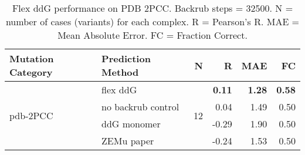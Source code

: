 \begin{table}
  \begin{tabular}{llrrrr}
\toprule
Mutation Category &   Prediction Method &   N &     R &  MAE &   FC \\
\midrule
 \multirow{ 4}{*}{pdb-2PCC} & flex ddG & \multirow{ 4}{*}{12} & \textbf{0.11} & \textbf{1.28} & \textbf{0.58}  \\
 & no backrub control & & 0.04 & 1.49 & 0.50  \\
 & ddG monomer & & -0.29 & 1.90 & 0.50  \\
 & ZEMu paper & & -0.24 & 1.53 & 0.50  \\
\bottomrule
\end{tabular}
  \caption[Flex ddG performance on PDB 2PCC]{
    Flex ddG performance on PDB 2PCC. Backrub steps = 32500. N = number of cases (variants) for each complex. R = Pearson's R. MAE = Mean Absolute Error. FC = Fraction Correct.
  } \label{tab:table-pdb-2PCC}
\end{table}
